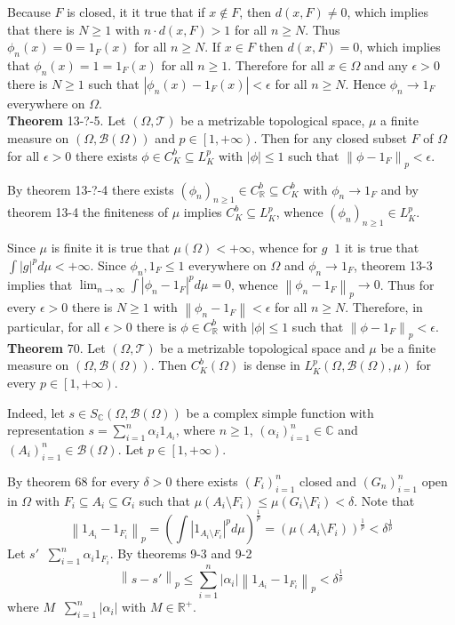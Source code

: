 \documentclass[a4paper]{article}
\newcommand{\clop}[1]{\left [ #1 \right )}
\newcommand{\brac}[1]{\left ( #1 \right )}
\newcommand{\abs}[1]{\left | #1 \right |}
\newcommand{\nrm}[1]{\left\| #1 \right \|}
\newcommand{\Real}{\mathbb{R}}
\newcommand{\Cplx}{\mathbb{C}}
\newcommand{\Tcal}{\mathcal{T}}
\newcommand{\borel}[1]{\mathcal{B}\brac{#1}}
\newcommand{\defn}{\mathop{\overset{\Delta}{=}}\nolimits}
\begin{document}
Because $F$ is closed, it it true that if $x\notin F$, then $d\brac{x,F}\neq 0$, which implies that there is $N\geq1$ with $n\cdot d\brac{x,F}>1$ for all $n\geq N$. Thus $\phi_n\brac{x}=0=1_F\brac{x}$ for all $n\geq N$. If $x\in F$ then $d\brac{x,F}=0$, which implies that $\phi_n\brac{x}=1=1_F\brac{x}$ for all $n\geq1$. Therefore for all $x\in \Omega$ and any $\epsilon>0$ there is $N\geq1$ such that $\abs{\phi_n\brac{x}-1_F\brac{x}}<\epsilon$ for all $n\geq N$. Hence $\phi_n\to 1_F$ everywhere on $\Omega$.\\

\label{thm:bound_cont_indic_lp} \noindent \textbf{Theorem} 13-?-5.
Let $\brac{\Omega, \Tcal}$ be a metrizable topological space, $\mu$ a finite measure on $\brac{\Omega, \borel{\Omega}}$ and $p\in \clop{1,+\infty}$. Then for any closed subset $F$ of $\Omega$ for all $\epsilon>0$ there exists $\phi\in C^b_K\subseteq L^p_K$ with $\abs{\phi}\leq 1$ such that $\nrm{\phi-1_F}_p<\epsilon$.

By theorem 13-?-4 there exists $\brac{\phi_n}_{n\geq1}\in C^b_\Real\subseteq C^b_K$ with $\phi_n\to 1_F$ and by theorem 13-4 the finiteness of $\mu$ implies $C^b_K\subseteq L^p_K$, whence $\brac{\phi_n}_{n\geq1}\in L^p_K$.

Since $\mu$ is finite it is true that $\mu\brac{\Omega}<+\infty$, whence for $g\defn 1$ it is true that $\int \abs{g}^p d\mu <+\infty$. Since $\phi_n,1_F\leq 1$ everywhere on $\Omega$ and $\phi_n\to 1_F$, theorem 13-3 implies that $\lim_{n\to\infty}\int \abs{\phi_n-1_F}^p d\mu = 0$, whence $\nrm{\phi_n-1_F}_p\to 0$. Thus for every $\epsilon>0$ there is $N\geq1$ with $\nrm{\phi_n-1_F}<\epsilon$ for all $n\geq N$. Therefore, in particular, for all $\epsilon>0$ there is $\phi\in C^b_\Real$ with $\abs{\phi}\leq 1$ such that $\nrm{\phi-1_F}_p<\epsilon$.\\

\label{thm:bound_cont_dense_lp} \noindent \textbf{Theorem} 70.
Let $\brac{\Omega,\Tcal}$ be a metrizable topological space and $\mu$ be a finite measure on $\brac{\Omega,\borel{\Omega}}$. Then $C^b_K\brac{\Omega}$ is dense in $L^p_K\brac{\Omega,\borel{\Omega},\mu}$ for every $p\in \clop{1, +\infty}$.

Indeed, let $s\in S_\Cplx\brac{\Omega,\borel{\Omega}}$ be a complex simple function with representation $s=\sum_{i=1}^n \alpha_i 1_{A_i}$, where $n\geq1$, $\brac{\alpha_i}_{i=1}^n\in \Cplx$ and $\brac{A_i}_{i=1}^n\in\borel{\Omega}$. Let $p\in \clop{1,+\infty}$.

By theorem 68 for every $\delta>0$ there exists $\brac{F_i}_{i=1}^n$ closed and $\brac{G_n}_{i=1}^n$ open in $\Omega$ with $F_i\subseteq A_i \subseteq G_i$ such that $\mu\brac{A_i\setminus F_i}\leq \mu\brac{G_i\setminus F_i}<\delta$. Note that \[\nrm{1_{A_i}-1_{F_i}}_p = \brac{\int \abs{1_{A_i\setminus F_i}}^p d\mu}^\frac{1}{p} = \brac{\mu\brac{A_i\setminus F_i}}^\frac{1}{p} < \delta^\frac{1}{p}\] Let $s'\defn \sum_{i=1}^n \alpha_i 1_{F_i}$. By theorems 9-3 and 9-2 \[\nrm{s-s'}_p\leq \sum_{i=1}^n \abs{\alpha_i}\nrm{1_{A_i}-1_{F_i}}_p < \delta^\frac{1}{p}\] where $M\defn \sum_{i=1}^n \abs{\alpha_i}$ with $M\in \Real^+$.
\end{document}
